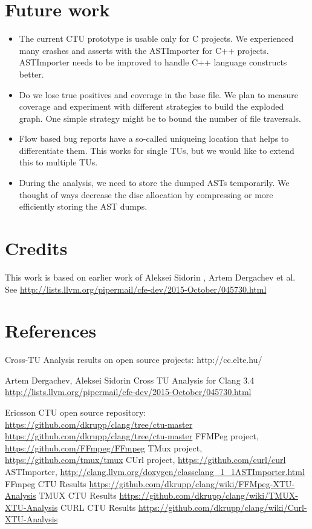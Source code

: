 \documentclass{article}
\begin{document}
\section{Future work}

\begin{itemize}
\item The current CTU prototype is usable only for C projects. 
We experienced many crashes and asserts with the ASTImporter for C++ projects. 
ASTImporter needs to be improved to handle C++ language constructs better.
\item Do we lose true positives and coverage in the base file. 
We plan to measure coverage and experiment with different strategies
to build the exploded graph. One simple strategy might be to bound
the number of file traversals.
\item Flow based bug reports have a so-called uniqueing location that helps
to differentiate them. This works for single TUs, but we would like
to extend this to multiple TUs.
\item During the analysis, we need to store the dumped ASTs temporarily. 
We thought of ways decrease the disc allocation by compressing or 
more efficiently storing the AST dumps.
\end{itemize}

\section{Credits}
This work is based on earlier work of Aleksei Sidorin , Artem Dergachev 
et al. See \url{http://lists.llvm.org/pipermail/cfe-dev/2015-October/045730.html}

\section{ References}
\begin{thebibliography}{9}
 Cross-TU Analysis results on open source projects: http://cc.elte.hu/

 Artem Dergachev, Aleksei Sidorin Cross TU Analysis for Clang 
3.4 \url{http://lists.llvm.org/pipermail/cfe-dev/2015-October/045730.html}

 Ericsson CTU open source repository: \url{https://github.com/dkrupp/clang/tree/ctu-master}
 \url{https://github.com/dkrupp/clang/tree/ctu-master}
 FFMPeg project,  \url{https://github.com/FFmpeg/FFmpeg}
 TMux project, \url{https://github.com/tmux/tmux}
 CUrl project, \url{https://github.com/curl/curl}
 ASTImporter, \url{http://clang.llvm.org/doxygen/classclang_1_1ASTImporter.html}
 FFmpeg CTU Results {\small \url{https://github.com/dkrupp/clang/wiki/FFMpeg-XTU-Analysis}}
 TMUX CTU Results \url{https://github.com/dkrupp/clang/wiki/TMUX-XTU-Analysis}
 CURL CTU Results \url{https://github.com/dkrupp/clang/wiki/Curl-XTU-Analysis}
\end{thebibliography}
\end{document}
